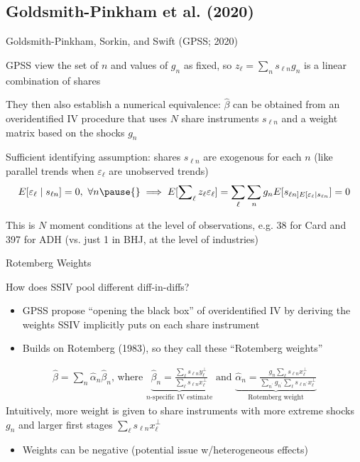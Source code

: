 \documentclass{beamer}
\begin{document}
\subsection{Goldsmith-Pinkham et al. (2020)}
\begin{frame}{Goldsmith-Pinkham, Sorkin, and Swift (GPSS; 2020)} 

 GPSS view the set of $n$ and values of $g_n$ as fixed, so $z_\ell=\sum_n s_{\ell n} g_n$ is a linear combination of shares
\medskip\pause{}

They then also establish a numerical equivalence:
$\hat{\beta}$ can be obtained from an overidentified IV procedure that uses $N$ share instruments $s_{\ell n}$ and a weight matrix based on the shocks $g_n$
\medskip\pause{}

Sufficient identifying assumption: shares $s_{\ell n}$ are exogenous for each $n$ (like parallel trends when $\varepsilon_\ell$ are unobserved trends)\smallskip
\begin{align*}
E[\varepsilon_\ell\mid s_{\ell n}]=0,\text{ }\forall n \pause{}\implies E[\sum_\ell\nolimits z_\ell\varepsilon_\ell]=\sum_\ell\sum_n g_nE[s_{\ell n]E[\varepsilon_\ell\mid s_{\ell n}}]=0
\end{align*}\pause{}\vspace{-0.4cm}

This is $N$ moment conditions at the level of observations, e.g. 38 for Card and 397 for ADH (vs. just 1 in BHJ, at the level of industries)

\end{frame}

\begin{frame}{Rotemberg Weights}

How does SSIV pool different diff-in-diffs?
\medskip
\begin{itemize}
\item GPSS propose ``opening the black box'' of overidentified IV by deriving the weights SSIV implicitly puts on each share instrument\smallskip
\item Builds on Rotemberg (1983), so they call these ``Rotemberg weights''
\end{itemize}
\begin{align*}
\hat{\beta}=\sum_n \hat{\alpha}_n\hat{\beta}_n\text{, where }\underbrace{\hat{\beta}_n=\frac{\sum_\ell s_{\ell n}y_\ell^\perp}{\sum_\ell s_{\ell n}x_\ell^\perp}}_{\text{$n$-specific IV estimate}}\text{ and }\underbrace{\hat{\alpha}_n=\frac{g_n\sum_\ell s_{\ell n}x_\ell^\perp}{\sum_{n^\prime}g_{n^\prime}\sum_\ell s_{\ell n^\prime}x_\ell^\perp}}_{\text{Rotemberg weight}}
\end{align*}\medskip\pause{}\vspace{-0.2cm}
Intuitively, more weight is given to share instruments with more extreme shocks $g_n$ and larger first stages $\sum_\ell s_{\ell n}x_\ell^\perp$\smallskip
\begin{itemize}
\item Weights can be negative (potential issue w/heterogeneous effects)
\end{itemize}
\end{frame}
\end{document}
